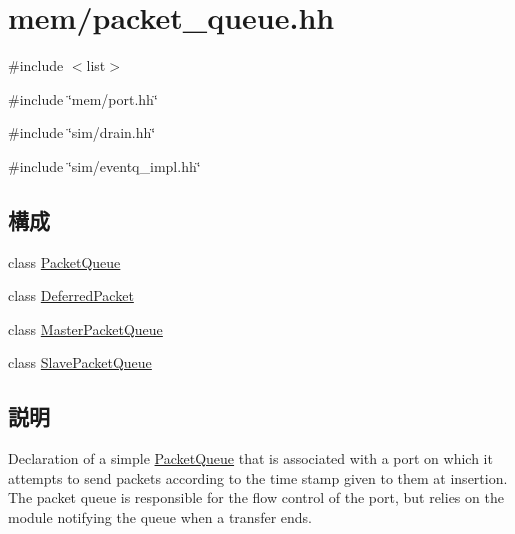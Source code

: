 \hypertarget{packet__queue_8hh}{
\section{mem/packet\_\-queue.hh}
\label{packet__queue_8hh}
}
{\ttfamily \#include $<$list$>$}\par
{\ttfamily \#include \char`\"{}mem/port.hh\char`\"{}}\par
{\ttfamily \#include \char`\"{}sim/drain.hh\char`\"{}}\par
{\ttfamily \#include \char`\"{}sim/eventq\_\-impl.hh\char`\"{}}\par
\subsection*{構成}
\begin{DoxyCompactItemize}
\item 
class \hyperlink{classPacketQueue}{PacketQueue}
\item 
class \hyperlink{classPacketQueue_1_1DeferredPacket}{DeferredPacket}
\item 
class \hyperlink{classMasterPacketQueue}{MasterPacketQueue}
\item 
class \hyperlink{classSlavePacketQueue}{SlavePacketQueue}
\end{DoxyCompactItemize}


\subsection{説明}
Declaration of a simple \hyperlink{classPacketQueue}{PacketQueue} that is associated with a port on which it attempts to send packets according to the time stamp given to them at insertion. The packet queue is responsible for the flow control of the port, but relies on the module notifying the queue when a transfer ends. 